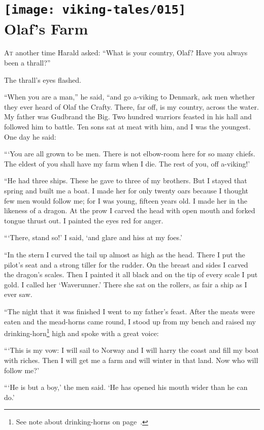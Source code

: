 \section[Olaf's Farm]{
    \texttt{[image: viking-tales/015]}\\
    Olaf's Farm}

\lettrine{A}{t} another time Harald asked:
\baselineskip
``What is your country, Olaf? Have you always been a thrall?''

The thrall's eyes flashed.

``When you are a man,'' he said, ``and go a-viking to Denmark, ask men
whether they ever heard of Olaf the Crafty. There, far off, is my
country, across the water. My father was Gudbrand the Big. Two hundred
warriors feasted in his hall and followed him to battle. Ten sons sat at
meat with him, and I was the youngest. One day he said:

```You are all grown to be men. There is not elbow-room here for so many
chiefs. The eldest of you shall have my farm when I die. The rest of
you, off a-viking!'

``He had three ships. These he gave to three of my brothers. But I stayed
that spring and built me a boat. I made her for only twenty oars because
I thought few men would follow me; for I was young, fifteen years old. I
made her in the likeness of a dragon. At the prow I carved the head with
open mouth and forked tongue thrust out. I painted the eyes red for
anger.

```There, stand so!' I said, `and glare and hiss at my foes.'

``In the stern I curved the tail up almost as high as the head. There I
put the pilot's seat and a strong tiller for the rudder. On the breast
and sides I carved the dragon's scales. Then I painted it all black and
on the tip of every scale I put gold. I called her `Waverunner.' There
she sat on the rollers, as fair a ship as I ever saw.

``The night that it was finished I went to my father's feast. After the
meats were eaten and the mead-horns came round, I stood up from my bench
and raised my drinking-horn\footnote{See note about drinking-horns on
page~\pageref{drinking-horns}.} high and spoke with a great voice:

```This is my vow: I will sail to Norway and I will harry the coast and
fill my boat with riches. Then I will get me a farm and will winter in
that land. Now who will follow me?'

```He is but a boy,' the men said. `He has opened his mouth wider than he
can do.'

